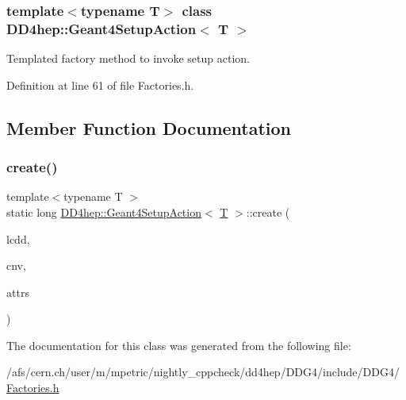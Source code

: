 \subsubsection*{template$<$typename T$>$\newline
class D\+D4hep\+::\+Geant4\+Setup\+Action$<$ T $>$}

Templated factory method to invoke setup action. 

Definition at line 61 of file Factories.\+h.



\subsection{Member Function Documentation}
\hypertarget{class_d_d4hep_1_1_geant4_setup_action_a361e27050900a95f90d6cf8a199a0820}{}\label{class_d_d4hep_1_1_geant4_setup_action_a361e27050900a95f90d6cf8a199a0820} 
\subsubsection{\texorpdfstring{create()}{create()}}
{\footnotesize\ttfamily template$<$typename T $>$ \\
static long \hyperlink{class_d_d4hep_1_1_geant4_setup_action}{D\+D4hep\+::\+Geant4\+Setup\+Action}$<$ \hyperlink{class_t}{T} $>$\+::create (\begin{DoxyParamCaption}\item[{\hyperlink{struct_d_d4hep_1_1_plugin_factory_base_a61b840cc18cdd24ae2e383da306b9c9a}{lcdd\+\_\+t} \&}]{lcdd,  }\item[{const \hyperlink{class_d_d4hep_1_1_geometry_1_1_geo_handler}{D\+D4hep\+::\+Geometry\+::\+Geo\+Handler} \&}]{cnv,  }\item[{const std\+::map$<$ \hyperlink{struct_d_d4hep_1_1_plugin_factory_base_aaa4c6d8801f70db2776c5473abc92692}{str\+\_\+t}, \hyperlink{struct_d_d4hep_1_1_plugin_factory_base_aaa4c6d8801f70db2776c5473abc92692}{str\+\_\+t} $>$ \&}]{attrs }\end{DoxyParamCaption})\hspace{0.3cm}{\ttfamily [static]}}



The documentation for this class was generated from the following file\+:\begin{DoxyCompactItemize}
\item 
/afs/cern.\+ch/user/m/mpetric/nightly\+\_\+cppcheck/dd4hep/\+D\+D\+G4/include/\+D\+D\+G4/\hyperlink{_d_d_g4_2include_2_d_d_g4_2_factories_8h}{Factories.\+h}\end{DoxyCompactItemize}

